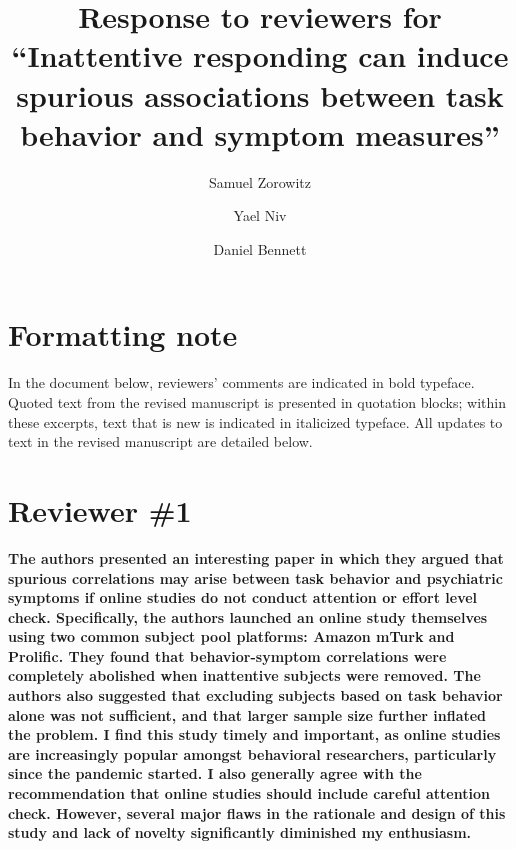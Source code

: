 \documentclass[a4paper,notitlepage,12pt]{article}
\author[1]{Samuel Zorowitz}
\author[1,2]{Yael Niv}
\author[1,3]{Daniel Bennett}
\affil[1]{Princeton Neuroscience Institute, Princeton University, USA}
\affil[2]{Department of Psychology, Princeton University, USA}
\affil[3]{School of Psychological Sciences, Monash University, Australia}
\title{Response to reviewers for ``Inattentive responding can induce spurious associations between task behavior and symptom measures''}
\date{}
\begin{document}

\maketitle

\section*{Formatting note}

In the document below, reviewers' comments are indicated in bold typeface. Quoted text from the revised manuscript is presented in quotation blocks; within these excerpts, text that is new is indicated in italicized typeface. All updates to text in the revised manuscript are detailed below.

\section*{Reviewer \#1}

\textbf{The authors presented an interesting paper in which they argued that spurious correlations may arise between task behavior and psychiatric symptoms if online studies do not conduct attention or effort level check. Specifically, the authors launched an online study themselves using two common subject pool platforms: Amazon mTurk and Prolific. They found that behavior-symptom correlations were completely abolished when inattentive subjects were removed. The authors also suggested that excluding subjects based on task behavior alone was not sufficient, and that larger sample size further inflated the problem. I find this study timely and important, as online studies are increasingly popular amongst behavioral researchers, particularly since the pandemic started. I also generally agree with the recommendation that online studies should include careful attention check. However, several major flaws in the rationale and design of this study and lack of novelty significantly diminished my enthusiasm.
}
\end{document}
